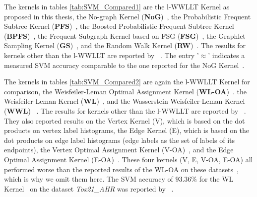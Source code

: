     	The kernels in tables \ref{tab:SVM_Compared1} are
    	the l-WWLLT Kernel as proposed in this thesis,    	
    	the No-graph Kernel (\textbf{NoG})~\cite{2019_Schulz_CONF},	
    	the Probabilistic Frequent Subtree Kernel (\textbf{PFS})~\cite{2017_Welke_CONF}, %
    	the Boosted Probabilistic Frequent Subtree Kernel (\textbf{BPFS})~\cite{2017_Welke_CONF}, %
    	the Frequent Subgraph Kernel based on FSG (\textbf{FSG})~\cite{2004_Kuramochi_IEEE}, %
    	the Graphlet Sampling Kernel (\textbf{GS})~\cite{2009_Shervashidze_PMLR}, %
    	and the Random Walk Kernel (\textbf{RW})~\cite{2003_Gaertner_CONF}. %
    	The results for kernels other than the l-WWLLT are reported by \citeauthor{2019_Schulz_CONF}~\cite{2019_Schulz_CONF}.
    	The entry '$\approx$' indicates a measured SVM accuracy comparable to the one reported for the NoG Kernel~\cite{2019_Schulz_CONF}.
    	
    	The kernels in tables \ref{tab:SVM_Compared2} are
    	again the l-WWLLT Kernel for comparison,    	
    	the Weisfeiler-Leman Optimal Assignment Kernel (\textbf{WL-OA})~\cite{2016_Kriege_NIPS}.
    	the Weisfeiler-Leman Kernel (\textbf{WL})~\cite{2011_Shervashidze_JMLR},
    	and the Wasserstein Weisfeiler-Leman Kernel (\textbf{WWL}) ~\cite{2019_Togninalli_NIPS}.
    	The results for kernels other than the l-WWLLT are reported by \citeauthor{2016_Kriege_NIPS}~\cite{2016_Kriege_NIPS}.
    	They also reported results on 
    	the Vertex Kernel (V), 	which is based on the dot products on vertex label histograms, 
    	the Edge Kernel (E), 		which is based on the dot products on edge label histograms (edge labels as the set of labels of its endpoints), 
    	the Vertex Optimal Assignment Kernel (V-OA)~\cite{2016_Kriege_NIPS}, and 
    	the Edge Optimal Assignment Kernel (E-OA)~\cite{2016_Kriege_NIPS}.
    	These four kernels (V, E, V-OA, E-OA) all performed worse than the reported results of the WL-OA on these datasets~\cite{2012_Kriege_CONF}, which is why we omit them here.    	
    	The SVM accuracy of $93.36\%$ for the WL Kernel~\cite{2011_Shervashidze_JMLR} %
    	on the dataset \textit{Tox21\_AHR} was reported by \citeauthor{2019_Schulz_CONF}~\cite{2019_Schulz_CONF}.
    	
